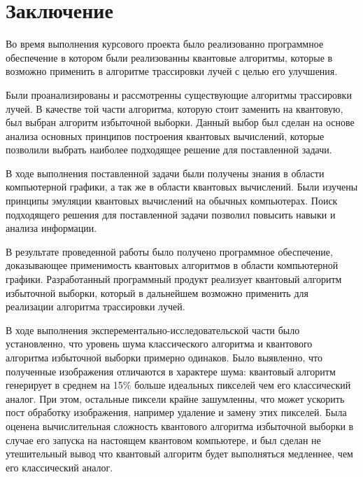 \chapter*{Заключение}

Во время выполнения курсового проекта было реализованно программное обеспечение в котором были реализованны квантовые алгоритмы, которые в возможно применить в алгоритме трассировки лучей с целью его улучшения.

Были проанализированы и рассмотренны существующие алгоритмы трассировки лучей. В качестве той части алгоритма, которую стоит заменить на квантовую, был выбран алгоритм избыточной выборки. Данный выбор был сделан на основе анализа основных принципов построения квантовых вычислений, которые позволили выбрать наиболее подходящее решение для поставленной задачи.

В ходе выполнения поставленной задачи были получены знания в области компьютерной графики, а так же в области квантовых вычислений. Были изучены принципы эмуляции квантовых вычислений на обычных компьютерах. Поиск подходящего решения для поставленной задачи позволил повысить навыки и анализа информации.

В результате проведенной работы было получено программное обеспечение, доказывающее применимость квантовых алгоритмов в области компьютерной графики. Разработанный программный продукт реализует квантовый алгоритм избыточной выборки, который в дальнейшем возможно применить для реализации алгоритма трассировки лучей.

В ходе выполнения эксперементально-исследовательской части было установленно, что уровень шума классического алгоритма и квантового алгоритма избыточной выборки примерно одинаков. Было выявленно, что полученные изображения отличаются в характере шума: квантовый алгоритм генерирует в среднем на 15\% больше идеальных пикселей чем его классический аналог. При этом, остальные пиксели крайне зашумленны, что может ускорить пост обработку изображения, например удаление и замену этих пикселей. Была оценена вычислительная сложность квантового алгоритма избыточной выборки в случае его запуска на настоящем квантовом компьютере, и был сделан не утешительный вывод что квантовый алгоритм будет выполняться медленнее, чем его классический аналог.

